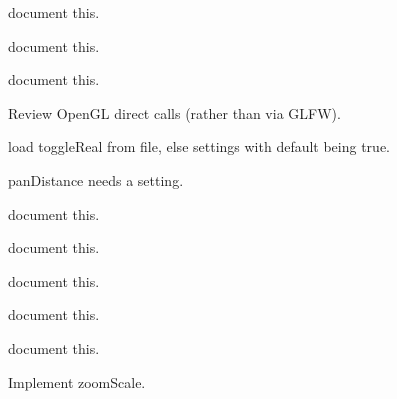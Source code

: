 \begin{DoxyRefList}
%
document this.  
\item[Member \mbox{\hyperlink{imgui__main_8c_a55e5254de2bc5047d00a331596fc1956}{update\+All\+View\+Select\+Box\+Colors}} (unsigned int colorL, unsigned int fillL, unsigned int colorR, unsigned int fillR, int alpha)]\label{todo__todo000169}%
%
document this.  
\item[Member \mbox{\hyperlink{imgui__main_8c_ad5c889067073aed7231513e6d906cda7}{vertical\+\_\+dimension\+\_\+action}} (void)]\label{todo__todo000191}%
%
document this.  
\item[Member \mbox{\hyperlink{imgui__main_8c_a1d7dbd1773573f522eac182c4799ba8b}{View\+\_\+\+\_\+}} (void)]\label{todo__todo000034}%
%
Review Open\+GL direct calls (rather than via GLFW).

\label{todo__todo000036}%
%
load toggle\+Real from file, else settings with default being true. 

\label{todo__todo000035}%
%
pan\+Distance needs a setting. 
\item[Member \mbox{\hyperlink{imgui__main_8c_ac8174d1035b7381b8a5940cdb1053b9b}{view\+\_\+empty\+\_\+double\+\_\+click}} (void)]\label{todo__todo000011}%
%
document this.  
\item[Member \mbox{\hyperlink{imgui__main_8c_a0871cb7dd9cb4de8391b002438003347}{view\+\_\+empty\+\_\+paint\+\_\+event}} (\mbox{\hyperlink{class_view}{View}} $\ast$view, int $\ast$event)]\label{todo__todo000012}%
%
document this.  
\item[Member \mbox{\hyperlink{imgui__main_8c_ab1f89ec04ac60db83ea678ac3c73bbb4}{vulcanize\+\_\+action}} (void)]\label{todo__todo000186}%
%
document this.  
\item[Member \mbox{\hyperlink{imgui__main_8c_ac8198c84e013c6fff241113b05e52c62}{whats\+\_\+this\+\_\+context\+\_\+help\+\_\+action}} (void)]\label{todo__todo000165}%
%
document this.  
\item[Member \mbox{\hyperlink{imgui__main_8c_a0780df1393f84c56ce0163f7da1320f0}{window\+\_\+menu\+\_\+about\+\_\+to\+\_\+show}} (void)]\label{todo__todo000200}%
%
document this.  
\item[Member \mbox{\hyperlink{imgui__main_8c_a9d77efa715f7141c72b9cc864fccab50}{zoom\+\_\+action}} (const char $\ast$arg)]\label{todo__todo000123}%
%
Implement zoom\+Scale. 


\end{DoxyRefList}
